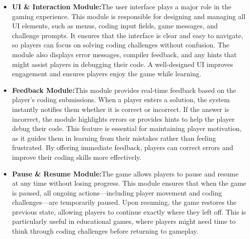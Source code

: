 \begin{itemize}
    \item \textbf{UI \& Interaction Module:}The user interface plays a major role in the gaming experience. This module is responsible for designing and managing all UI elements, such as menus, coding input fields, game messages, and challenge prompts. It ensures that the interface is clear and easy to navigate, so players can focus on solving coding challenges without confusion. The module also displays error messages, compiler feedback, and any hints that might assist players in debugging their code. A well-designed UI improves engagement and ensures players enjoy the game while learning.
    \item \textbf{Feedback Module:}This module provides real-time feedback based on the player's coding submissions. When a player enters a solution, the system instantly notifies them whether it is correct or incorrect. If the answer is incorrect, the module highlights errors or provides hints to help the player debug their code. This feature is essential for maintaining player motivation, as it guides them in learning from their mistakes rather than feeling frustrated. By offering immediate feedback, players can correct errors and improve their coding skills more effectively.
    \item \textbf{Pause \& Resume Module:}The game allows players to pause and resume at any time without losing progress. This module ensures that when the game is paused, all ongoing actions—including player movement and coding challenges—are temporarily paused. Upon resuming, the game restores the previous state, allowing players to continue exactly where they left off. This is particularly useful in educational games, where players might need time to think through coding challenges before returning to gameplay.
    
\end{itemize}

